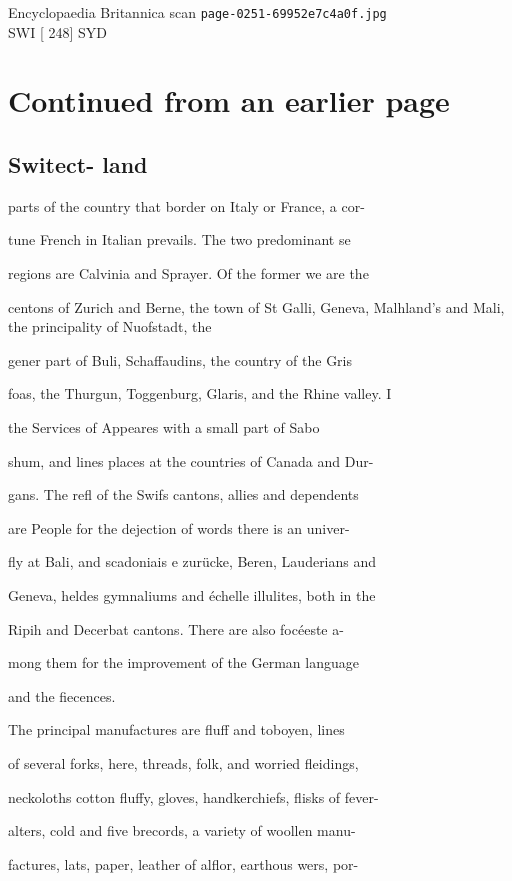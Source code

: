 \documentclass{article}
\begin{document}
\begin{center}
{\Large Encyclopaedia Britannica scan \texttt{page-0251-69952e7c4a0f.jpg}}\\[0.5em]
SWI [ 248] SYD
\end{center}
\section*{Continued from an earlier page}
\subsection*{Switect- land}
parts of the country that border on Italy or France, a cor-

tune French in Italian prevails. The two predominant se

regions are Calvinia and Sprayer. Of the former we are the

centons of Zurich and Berne, the town of St Galli, Geneva, Malhland’s and Mali, the principality of Nuofstadt, the

gener part of Buli, Schaffaudins, the country of the Gris

foas, the Thurgun, Toggenburg, Glaris, and the Rhine valley. I

the Services of Appeares with a small part of Sabo

shum, and lines places at the countries of Canada and Dur-

gans. The refl of the Swifs cantons, allies and dependents

are People for the dejection of words there is an univer-

fly at Bali, and scadoniais e zurücke, Beren, Lauderians and

Geneva, heldes gymnaliums and échelle illulites, both in the

Ripih and Decerbat cantons. There are also focéeste a-

mong them for the improvement of the German language

and the fiecences.

The principal manufactures are fluff and toboyen, lines

of several forks, here, threads, folk, and worried fleidings,

neckoloths cotton fluffy, gloves, handkerchiefs, flisks of fever-

alters, cold and five brecords, a variety of woollen manu-

factures, lats, paper, leather of alflor, earthous wers, por-
\end{document}
